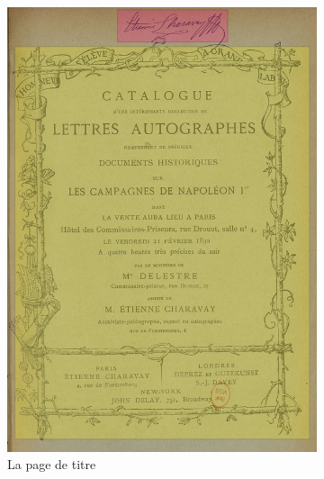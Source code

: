 \begin{figure}
	\begin{subfigure}{0.33\textwidth}
		\includegraphics[width=\textwidth]{img/cat_000434_couv_zones.png}
		\caption{La page de titre}
		\label{fig:cattitle}
	\end{subfigure}
	\begin{subfigure}{0.33\textwidth}

\end{subfigure}
\end{figure}
